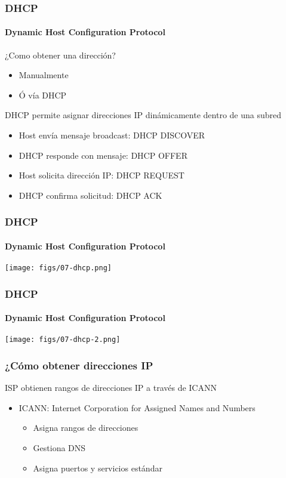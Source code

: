 \documentclass[letter]{beamer}
\begin{document}
\begin{frame}
  \frametitle{DHCP}
  \framesubtitle{Dynamic Host Configuration Protocol}
  
  ¿Como obtener una dirección?
  \begin{itemize}
    \item Manualmente
    \item Ó vía DHCP
  \end{itemize}
  
  DHCP permite asignar direcciones IP dinámicamente dentro de una subred
  \begin{itemize}
    \item Host envía mensaje broadcast: DHCP DISCOVER
    \item DHCP responde con mensaje: DHCP OFFER
    \item Host solicita dirección IP: DHCP REQUEST
    \item DHCP confirma solicitud: DHCP ACK
  \end{itemize}

\end{frame}
\begin{frame}
  \frametitle{DHCP}
  \framesubtitle{Dynamic Host Configuration Protocol}

  \begin{center}
    \texttt{[image: figs/07-dhcp.png]}
  \end{center}

\end{frame}
\begin{frame}
  \frametitle{DHCP}
  \framesubtitle{Dynamic Host Configuration Protocol}

  \begin{center}
    \texttt{[image: figs/07-dhcp-2.png]}
  \end{center}

\end{frame}
\begin{frame}
  \frametitle{¿Cómo obtener direcciones IP}

  ISP obtienen rangos de direcciones IP a través de ICANN
  \begin{itemize}
    \item ICANN: Internet Corporation for Assigned Names and Numbers
    \begin{itemize}
      \item Asigna rangos de direcciones
      \item Gestiona DNS
      \item Asigna puertos y servicios estándar
    \end{itemize}
  \end{itemize}
\end{frame}
\end{document}
